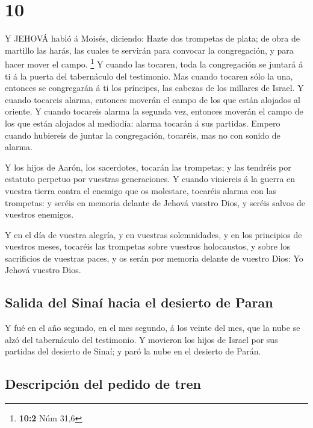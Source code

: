 \hypertarget{section-9}{%
\section{10}\label{section-9}}

 Y JEHOVÁ habló á Moisés, diciendo:  Hazte dos
trompetas de plata; de obra de martillo las harás, las cuales te
servirán para convocar la congregación, y para hacer mover el campo.
\footnote{\textbf{10:2} Núm 31,6}  Y cuando las tocaren,
toda la congregación se juntará á ti á la puerta del tabernáculo del
testimonio.  Mas cuando tocaren sólo la una, entonces se
congregarán á ti los príncipes, las cabezas de los millares de Israel.
 Y cuando tocareis alarma, entonces moverán el campo de los
que están alojados al oriente.  Y cuando tocareis alarma la
segunda vez, entonces moverán el campo de los que están alojados al
mediodía: alarma tocarán á sus partidas.  Empero cuando
hubiereis de juntar la congregación, tocaréis, mas no con sonido de
alarma.

 Y los hijos de Aarón, los sacerdotes, tocarán las
trompetas; y las tendréis por estatuto perpetuo por vuestras
generaciones.  Y cuando viniereis á la guerra en vuestra
tierra contra el enemigo que os molestare, tocaréis alarma con las
trompetas: y seréis en memoria delante de Jehová vuestro Dios, y seréis
salvos de vuestros enemigos.

 Y en el día de vuestra alegría, y en vuestras
solemnidades, y en los principios de vuestros meses, tocaréis las
trompetas sobre vuestros holocaustos, y sobre los sacrificios de
vuestras paces, y os serán por memoria delante de vuestro Dios: Yo
Jehová vuestro Dios.

\hypertarget{salida-del-sinauxed-hacia-el-desierto-de-paran}{%
\subsection{Salida del Sinaí hacia el desierto de
Paran}\label{salida-del-sinauxed-hacia-el-desierto-de-paran}}

 Y fué en el año segundo, en el mes segundo, á los veinte
del mes, que la nube se alzó del tabernáculo del testimonio.
 Y movieron los hijos de Israel por sus partidas del
desierto de Sinaí; y paró la nube en el desierto de Parán.

\hypertarget{descripciuxf3n-del-pedido-de-tren}{%
\subsection{Descripción del pedido de
tren}\label{descripciuxf3n-del-pedido-de-tren}}

